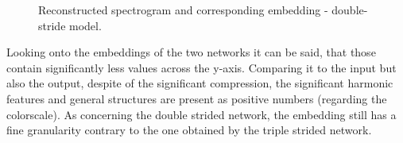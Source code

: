 \begin{figure}[htb!]
    \centering
    \captionsetup{justification=centering}
    \caption{Reconstructed spectrogram and corresponding embedding - double-stride model.}
    \label{fig:res_double_str_2D_output_emb}
\end{figure}

Looking onto the embeddings of the two networks it can be said, that those contain significantly less values across the y-axis. Comparing it to the input but also the output, despite of the significant compression, the significant harmonic features and general structures are present as positive numbers (regarding the colorscale). As concerning the double strided network, the embedding still has a fine granularity contrary to the one obtained by the triple strided network.

